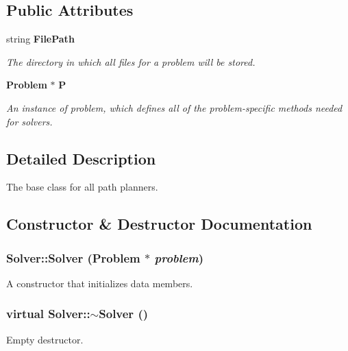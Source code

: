 \subsection*{Public Attributes}
\begin{CompactItemize}
\item 
string {\bf File\-Path}
\begin{CompactList}\small\item\em The directory in which all files for a problem will be stored.\item\end{CompactList}\item 
{\bf Problem} $\ast$ {\bf P}
\begin{CompactList}\small\item\em An instance of problem, which defines all of the problem-specific methods needed for solvers.\item\end{CompactList}\end{CompactItemize}


\subsection{Detailed Description}
The base class for all path planners.



\subsection{Constructor \& Destructor Documentation}
\subsubsection{\setlength{\rightskip}{0pt plus 5cm}Solver::Solver ({\bf Problem} $\ast$ {\em problem})}\label{classSolver_a0}


A constructor that initializes data members.

\subsubsection{\setlength{\rightskip}{0pt plus 5cm}virtual Solver::$\sim$Solver ()\hspace{0.3cm}{\tt  [inline, virtual]}}\label{classSolver_a1}


Empty destructor.



